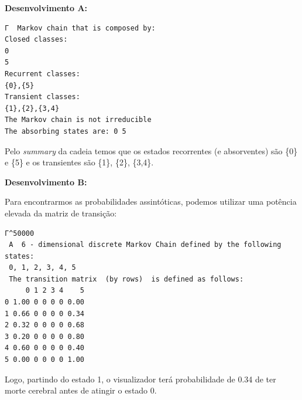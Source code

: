\documentclass[
]{article}
\begin{document}
\textbf{Desenvolvimento A:}

\begin{verbatim}
Γ  Markov chain that is composed by: 
Closed classes: 
0 
5 
Recurrent classes: 
{0},{5}
Transient classes: 
{1},{2},{3,4}
The Markov chain is not irreducible 
The absorbing states are: 0 5
\end{verbatim}

Pelo \emph{summary} da cadeia temos que os estados recorrentes (e
absorventes) são \{0\} e \{5\} e os transientes são \{1\}, \{2\},
\{3,4\}.

\pagebreak

\textbf{Desenvolvimento B:}

Para encontrarmos as probabilidades assintóticas, podemos utilizar uma
potência elevada da matriz de transição:

\begin{verbatim}
Γ^50000 
 A  6 - dimensional discrete Markov Chain defined by the following states: 
 0, 1, 2, 3, 4, 5 
 The transition matrix  (by rows)  is defined as follows: 
     0 1 2 3 4    5
0 1.00 0 0 0 0 0.00
1 0.66 0 0 0 0 0.34
2 0.32 0 0 0 0 0.68
3 0.20 0 0 0 0 0.80
4 0.60 0 0 0 0 0.40
5 0.00 0 0 0 0 1.00
\end{verbatim}

Logo, partindo do estado 1, o visualizador terá probabilidade de 0.34 de
ter morte cerebral antes de atingir o estado 0.
\end{document}
